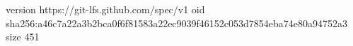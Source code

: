 version https://git-lfs.github.com/spec/v1
oid sha256:a46c7a22a3b2bca0f6f81583a22ec9039f46152c053d7854eba74e80a94752a3
size 451
